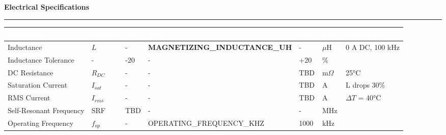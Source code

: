 \documentclass[10pt,a4paper]{article}
\newcommand{\sectiontitle}[1]{%
    \vspace{3mm}%
    {\large\bfseries\color{primary}#1}%
    \vspace{1mm}%
    \hrule height 0.3pt%
    \vspace{2mm}%
}
\newcommand{\specvalue}[1]{\textbf{#1}}
\begin{document}
\vspace{4mm}

\sectiontitle{Electrical Specifications}

\renewcommand{\arraystretch}{1.25}
{\footnotesize
\begin{tabular}{|L{45mm}|C{12mm}|C{22mm}|C{22mm}|C{22mm}|C{15mm}|L{32mm}|}
\hline
{}
\textcolor{white}{\textbf{Parameter}} & 
\textcolor{white}{\textbf{Symbol}} & 
\textcolor{white}{\textbf{Min}} & 
\textcolor{white}{\textbf{Typ}} & 
\textcolor{white}{\textbf{Max}} & 
\textcolor{white}{\textbf{Unit}} & 
\textcolor{white}{\textbf{Conditions}} \\
\hline
Inductance & $L$ & - & \specvalue{{{MAGNETIZING_INDUCTANCE_UH}}} & - & $\mu$H & 0 A DC, 100 kHz \\
Inductance Tolerance & - & -20 & - & +20 & \% & \\
DC Resistance & $R_{DC}$ & - & - & TBD & m$\Omega$ & 25°C \\
Saturation Current & $I_{sat}$ & - & - & TBD & A & L drops 30\% \\
RMS Current & $I_{rms}$ & - & - & TBD & A & $\Delta T$ = 40°C \\
Self-Resonant Frequency & SRF & TBD & - & - & MHz & \\
Operating Frequency & $f_{op}$ & - & {{OPERATING_FREQUENCY_KHZ}} & 1000 & kHz & \\
\hline
\end{tabular}
}

\vspace{4mm}
\end{document}

